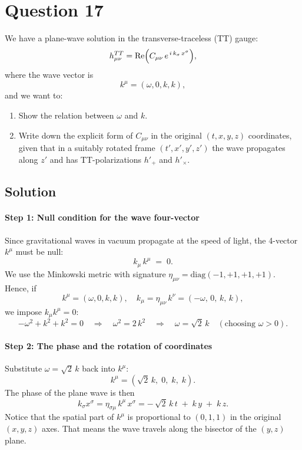 \documentclass{article}
\begin{document}
\pagebreak

\section*{Question 17}

We have a plane-wave solution in the transverse-traceless (TT) gauge:
\[
h_{\mu \nu}^{TT} = \mathrm{Re}\Bigl(C_{\mu \nu}\, e^{\,i\,k_{\sigma}\,x^{\sigma}}\Bigr),
\]
where the wave vector is
\[
k^{\mu} = (\omega, 0, k, k),
\]
and we want to:

\begin{enumerate}
  \item Show the relation between $\omega$ and $k$.
  \item Write down the explicit form of $C_{\mu\nu}$ in the original $(t,x,y,z)$ coordinates, given that in a suitably rotated frame $(t',x',y',z')$ the wave propagates along $z'$ and has TT-polarizations $h'_+$ and $h'_\times$.
\end{enumerate}

\bigskip

\subsection*{Solution}

\paragraph{Step 1: Null condition for the wave four-vector}

Since gravitational waves in vacuum propagate at the speed of light, the 4-vector $k^\mu$ must be null:
\[
k_{\mu}\,k^{\mu} \;=\; 0.
\]
We use the Minkowski metric with signature $\eta_{\mu\nu} = \mathrm{diag}(-1, +1, +1, +1)$. Hence, if
\[
k^{\mu} = (\omega, 0, k, k),
\quad
k_{\mu} = \eta_{\mu\nu}\,k^\nu = (-\omega,\,0,\,k,\,k),
\]
we impose $k_{\mu}k^{\mu} = 0$:
\[
-\omega^2 + k^2 + k^2 = 0
\quad \Longrightarrow \quad
\omega^2 = 2\,k^2
\quad \Longrightarrow \quad
\omega = \sqrt{2}\,k
\quad (\text{choosing }\omega>0).
\]

\bigskip

\paragraph{Step 2: The phase and the rotation of coordinates}

Substitute $\omega = \sqrt{2}\,k$ back into $k^{\mu}$:
\[
k^{\mu} = (\sqrt{2}\,k,\; 0,\; k,\; k).
\]
The phase of the plane wave is then
\[
k_{\sigma} x^\sigma
= \eta_{\sigma\mu}\,k^\mu\,x^\sigma
= -\,\sqrt{2}\,k\,t \;+\; k\,y \;+\; k\,z.
\]
Notice that the spatial part of $k^\mu$ is proportional to $(0,1,1)$ in the original $(x,y,z)$ axes. That means the wave travels along the bisector of the $(y,z)$ plane.
\end{document}
